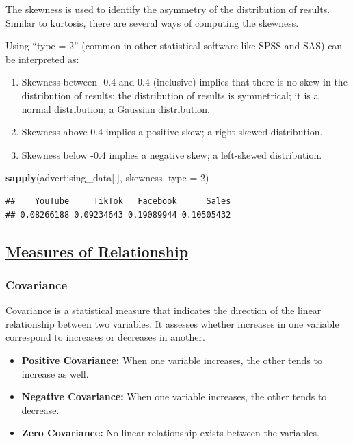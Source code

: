 \documentclass[
]{article}
\newenvironment{Shaded}{\begin{snugshade}}{\end{snugshade}}
\newcommand{\AttributeTok}[1]{\textcolor[rgb]{0.13,0.29,0.53}{#1}}
\newcommand{\DecValTok}[1]{\textcolor[rgb]{0.00,0.00,0.81}{#1}}
\newcommand{\FunctionTok}[1]{\textcolor[rgb]{0.13,0.29,0.53}{\textbf{#1}}}
\newcommand{\NormalTok}[1]{#1}
\begin{document}
The skewness is used to identify the asymmetry of the distribution of
results. Similar to kurtosis, there are several ways of computing the
skewness.

Using ``type = 2'' (common in other statistical software like SPSS and
SAS) can be interpreted as:

\begin{enumerate}
\def\labelenumi{\arabic{enumi}.}
\item
  Skewness between -0.4 and 0.4 (inclusive) implies that there is no
  skew in the distribution of results; the distribution of results is
  symmetrical; it is a normal distribution; a Gaussian distribution.
\item
  Skewness above 0.4 implies a positive skew; a right-skewed
  distribution.
\item
  Skewness below -0.4 implies a negative skew; a left-skewed
  distribution.
\end{enumerate}

\begin{Shaded}
\begin{Highlighting}[]
\FunctionTok{sapply}\NormalTok{(advertising\_data[,], skewness, }\AttributeTok{type =} \DecValTok{2}\NormalTok{)}
\end{Highlighting}
\end{Shaded}

\begin{verbatim}
##    YouTube     TikTok   Facebook      Sales 
## 0.08266188 0.09234643 0.19089944 0.10505432
\end{verbatim}

\subsection{\texorpdfstring{\ul{\textbf{Measures of
Relationship}}}{Measures of Relationship}}\label{measures-of-relationship}

\subsubsection{\texorpdfstring{\textbf{Covariance}}{Covariance}}\label{covariance}

Covariance is a statistical measure that indicates the direction of the
linear relationship between two variables. It assesses whether increases
in one variable correspond to increases or decreases in
another.\hspace{0pt}

\begin{itemize}
\item
  \textbf{Positive Covariance:} When one variable increases, the other
  tends to increase as well.
\item
  \textbf{Negative Covariance:} When one variable increases, the other
  tends to decrease.
\item
  \textbf{Zero Covariance:} No linear relationship exists between the
  variables.
\end{itemize}
\end{document}
